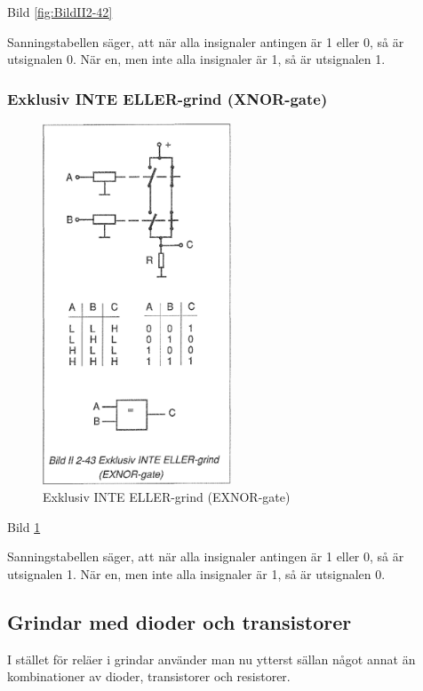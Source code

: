 Bild \ref{fig:BildII2-42}

Sanningstabellen säger, att när alla insignaler antingen är 1 eller 0, så är
utsignalen 0. När en, men inte alla insignaler är 1, så är utsignalen 1.

\subsubsection{Exklusiv INTE ELLER-grind (XNOR-gate)}

\begin{figure}
\includegraphics[width=0.5\textwidth]{images/bild_2_2-43}
\caption{Exklusiv INTE ELLER-grind (EXNOR-gate)}
\label{fig:BildII2-43}
\end{figure}

Bild \ref{fig:BildII2-43}

Sanningstabellen säger, att när alla insignaler antingen är 1 eller 0, så är
utsignalen 1. När en, men inte alla insignaler är 1, så är utsignalen 0.

\subsection{Grindar med dioder och transistorer}

I stället för reläer i grindar använder man nu ytterst sällan något annat än
kombinationer av dioder, transistorer och resistorer.

